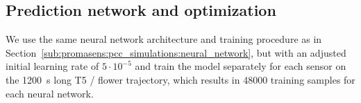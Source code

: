         


\subsection{Prediction network and optimization}\label{sub:promasens:experiments_neural_network}
We use the same neural network architecture and training procedure as in Section~\ref{sub:promasens:pcc_simulations:neural_network}, but with an adjusted initial learning rate of $5 \cdot 10^{-5}$ and train the model separately for each sensor on the \SI{1200}{s} long T5 / flower trajectory, which results in \SI{48000}{} training samples for each neural network.

